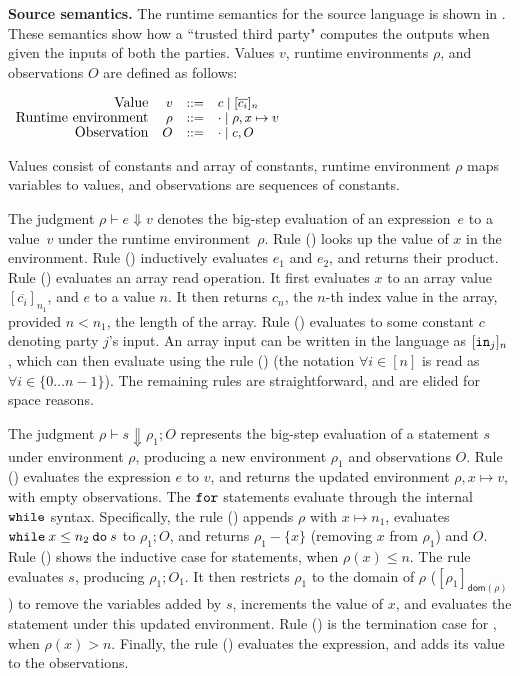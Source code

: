 \noindent\textbf{Source semantics.} The runtime semantics for the source language is shown in
. These semantics show how a ``trusted third party" computes the outputs when given the inputs of both the parties. 
 Values $v$, runtime environments $\rho$, and
observations $O$ are defined as follows:

\vspace{0.1cm}
$
\footnotesize
\begin{array}{rrcl}
    \ftext{Value} & v &::=& c \mid [\overline{c_{i}}]_{n}\\
    \ftext{Runtime environment} & \rho &::=& \cdot \mid \rho,x \mapsto v\\
    \ftext{Observation} & O & ::= & \cdot \mid c, O \\
\end{array}
$

\vspace{0.1cm}
Values consist of constants and array of constants, runtime environment
$\rho$ maps variables to values, and observations are sequences of
constants.

The judgment $\rho \vdash e \Downarrow v$ denotes the big-step
evaluation of an expression~$e$ to a value~$v$ under the runtime
environment~$\rho$. Rule ({}) looks up the value of $x$ in
the environment. Rule ({}) inductively evaluates $e_{1}$ and
$e_{2}$, and returns their product. Rule ({})
evaluates an array read operation. It first evaluates $x$ to an array
value $[\overline{c_{i}}]_{n_{1}}$, and $e$ to a  value
$n$. It then returns $c_{n}$, the $n$-th index value in the array,
provided $n < n_{1}$, the length of the array. Rule ({})
evaluates to some constant $c$ denoting party $j$'s input. 
An array input can be written in the
language as $[{\mathtt{in}}_{j}]_{n}$, which can then evaluate using the
rule ({}) (the notation $\forall i \in [n]$ is read
  as $\forall i \in \{0\dots n - 1\}$). The remaining rules are
straightforward, and are elided for space reasons.

The judgment $\rho \vdash s \Downarrow \rho_{1}; O$ represents the
big-step evaluation of a statement $s$ under environment $\rho$,
producing a new environment $\rho_{1}$ and observations $O$. Rule
({}) evaluates the expression $e$ to $v$, and returns the
updated environment $\rho,x \mapsto v$, with empty observations. The
${\mathtt{for}}$ statements evaluate
through the internal ${\mathtt{while}}$ syntax. Specifically, the rule
({}) appends $\rho$ with $x\mapsto n_{1}$,
evaluates ${\mathtt{while}}\:{x} \leq {n_{2}}\:{\mathtt{do}}\:{s}$ to $\rho_{1}; O$, and returns
$\rho_{1} - \{x\}$ (removing $x$ from $\rho_{1}$) and $O$. Rule
({}) shows the inductive case for 
statements, when $\rho(x) \leq n$. The rule evaluates $s$, producing
$\rho_{1}; O_{1}$. It then restricts $\rho_{1}$ to the domain of
$\rho$ ($[\rho_{1}]_{\mathsf{dom}(\rho)}$) to remove the variables
added by $s$, increments the value of $x$, and evaluates the
 statement under this updated environment. Rule
({}) is the termination case for ,
when $\rho(x) > n$. Finally, the rule ({}) evaluates the
expression, and adds its value to the observations.

